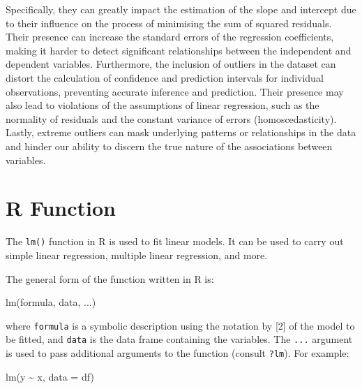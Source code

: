\documentclass[
  letterpaper,
]{book}
\newenvironment{Shaded}{\begin{snugshade}}{\end{snugshade}}
\newcommand{\AttributeTok}[1]{\textcolor[rgb]{0.40,0.45,0.13}{#1}}
\newcommand{\FunctionTok}[1]{\textcolor[rgb]{0.28,0.35,0.67}{#1}}
\newcommand{\NormalTok}[1]{\textcolor[rgb]{0.00,0.23,0.31}{#1}}
\newcommand{\SpecialCharTok}[1]{\textcolor[rgb]{0.37,0.37,0.37}{#1}}
\newcommand*\circled[1]{\tikz[baseline=(char.base)]{
          \node[shape=circle,draw,inner sep=1pt] (char) {{\scriptsize#1}};}}
\begin{document}
Specifically, they can greatly impact the estimation of the slope and
intercept due to their influence on the process of minimising the sum of
squared residuals. Their presence can increase the standard errors of
the regression coefficients, making it harder to detect significant
relationships between the independent and dependent variables.
Furthermore, the inclusion of outliers in the dataset can distort the
calculation of confidence and prediction intervals for individual
observations, preventing accurate inference and prediction. Their
presence may also lead to violations of the assumptions of linear
regression, such as the normality of residuals and the constant variance
of errors (homoscedasticity). Lastly, extreme outliers can mask
underlying patterns or relationships in the data and hinder our ability
to discern the true nature of the associations between variables.

\section{R Function}\label{r-function-1}

The \texttt{lm()} function in R is used to fit linear models. It can be
used to carry out simple linear regression, multiple linear regression,
and more.

The general form of the function written in R is:

\begin{Shaded}
\begin{Highlighting}[]
\FunctionTok{lm}\NormalTok{(formula, data, ...)}
\end{Highlighting}
\end{Shaded}

where \texttt{formula} is a symbolic description using the notation by
{[}2{]} of the model to be fitted, and \texttt{data} is the data frame
containing the variables. The \texttt{...} argument is used to pass
additional arguments to the function (consult \texttt{?lm}). For
example:

\label{annotated-cell-4}%
\begin{Shaded}
\begin{Highlighting}[]
\FunctionTok{lm}\NormalTok{(y }\SpecialCharTok{\textasciitilde{}}\NormalTok{ x, }\AttributeTok{data =}\NormalTok{ df) }\hspace*{\fill}\NormalTok{\circled{1}}
\end{Highlighting}
\end{Shaded}
\end{document}
